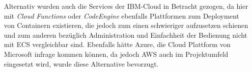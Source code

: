 Alternativ wurden auch die Services der IBM-Cloud in Betracht gezogen, da hier mit \textit{Cloud Functions} oder \textit{CodeEngine} ebenfalls Plattformen zum Deployment von Containern existieren, die jedoch zum einen schwieriger aufzusetzen schienen und zum anderen bezüglich Administration und Einfachheit der Bedienung nicht mit \ac{ECS} vergleichbar sind. Ebenfalls hätte Azure, die Cloud Plattform von Microsoft infrage kommen können, da jedoch \ac{AWS} auch im Projektumfeld eingesetzt wird, wurde diese Alternative bevorzugt. \pagebreak